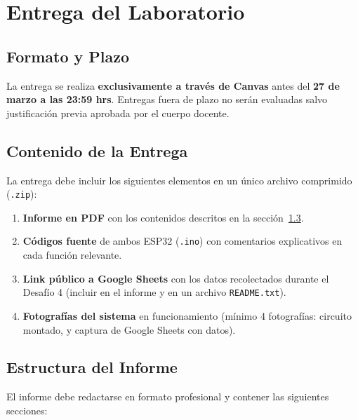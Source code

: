 \documentclass[12pt,leqno]{article}
\begin{document}
\pagebreak
\section{Entrega del Laboratorio}

\subsection{Formato y Plazo}

La entrega se realiza \textbf{exclusivamente a trav\'es de Canvas} antes del
\textbf{27 de marzo a las 23:59 hrs}. Entregas fuera de plazo no ser\'an evaluadas
salvo justificaci\'on previa aprobada por el cuerpo docente.

\subsection{Contenido de la Entrega}

La entrega debe incluir los siguientes elementos en un \'unico archivo comprimido
(\texttt{.zip}):

\begin{enumerate}[(1)]
    \item \textbf{Informe en PDF} con los contenidos descritos en la
    secci\'on~\ref{sec:informe}.
    \item \textbf{C\'odigos fuente} de ambos ESP32 (\texttt{.ino}) con comentarios
    explicativos en cada funci\'on relevante.
    \item \textbf{Link p\'ublico a Google Sheets} con los datos recolectados durante
    el Desaf\'io 4 (incluir en el informe y en un archivo \texttt{README.txt}).
    \item \textbf{Fotograf\'ias del sistema} en funcionamiento (m\'inimo 4
    fotograf\'ias: circuito montado, y captura de Google
    Sheets con datos).
\end{enumerate}

\subsection{Estructura del Informe}
\label{sec:informe}

El informe debe redactarse en formato profesional y contener las siguientes
secciones:
\end{document}
